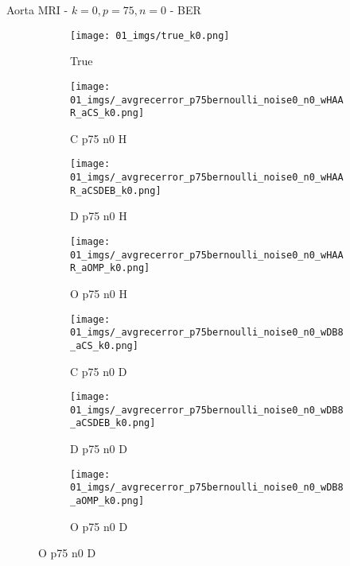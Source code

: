 \begin{frame}{Aorta MRI - $k=0,p=75,n=0$ - BER}{}
\begin{figure}
\begin{subfigure}{0.13\textwidth}
\texttt{[image: 01\_imgs/true\_k0.png]}
\caption*{\tiny True}
\end{subfigure}
\begin{subfigure}{0.13\textwidth}
\texttt{[image: 01\_imgs/\_avgrecerror\_p75bernoulli\_noise0\_n0\_wHAAR\_aCS\_k0.png]}
\caption*{\tiny C p75 n0 H}
\end{subfigure}
\begin{subfigure}{0.13\textwidth}
\texttt{[image: 01\_imgs/\_avgrecerror\_p75bernoulli\_noise0\_n0\_wHAAR\_aCSDEB\_k0.png]}
\caption*{\tiny D p75 n0 H}
\end{subfigure}
\begin{subfigure}{0.13\textwidth}
\texttt{[image: 01\_imgs/\_avgrecerror\_p75bernoulli\_noise0\_n0\_wHAAR\_aOMP\_k0.png]}
\caption*{\tiny O p75 n0 H}
\end{subfigure}
\begin{subfigure}{0.13\textwidth}
\texttt{[image: 01\_imgs/\_avgrecerror\_p75bernoulli\_noise0\_n0\_wDB8\_aCS\_k0.png]}
\caption*{\tiny C p75 n0 D}
\end{subfigure}
\begin{subfigure}{0.13\textwidth}
\texttt{[image: 01\_imgs/\_avgrecerror\_p75bernoulli\_noise0\_n0\_wDB8\_aCSDEB\_k0.png]}
\caption*{\tiny D p75 n0 D}
\end{subfigure}
\begin{subfigure}{0.13\textwidth}
\texttt{[image: 01\_imgs/\_avgrecerror\_p75bernoulli\_noise0\_n0\_wDB8\_aOMP\_k0.png]}
\caption*{\tiny O p75 n0 D}
\end{subfigure}

\vspace{5pt}


\end{figure}
\end{frame}
